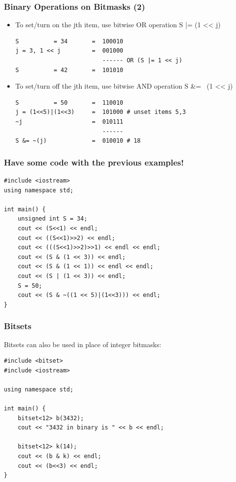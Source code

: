 \documentclass{beamer}
\begin{document}
\begin{frame}[fragile]
  \frametitle{Binary Operations on Bitmasks (2)}
  {\smaller
  \begin{itemize}
  \item To set/turn on the jth item, use bitwise OR operation S |= (1 << j)
\begin{verbatim}
S          = 34       =  100010
j = 3, 1 << j         =  001000
                         ------ OR (S |= 1 << j)
S          = 42       =  101010
\end{verbatim}
\item To set/turn off the jth item, use bitwise AND operation S \&= ~(1 << j)
\begin{verbatim}
S          = 50       =  110010
j = (1<<5)|(1<<3)     =  101000 # unset items 5,3 
~j                    =  010111
                         ------
S &= ~(j)             =  010010 # 18
\end{verbatim}
  \end{itemize}

  }
\end{frame}

\begin{frame}[fragile]
  \frametitle{Have some code with the previous examples!}
  {\smaller
\begin{verbatim}
#include <iostream>
using namespace std;

int main() {
    unsigned int S = 34;    
    cout << (S<<1) << endl;
    cout << ((S<<1)>>2) << endl;
    cout << (((S<<1)>>2)>>1) << endl << endl;    
    cout << (S & (1 << 3)) << endl;
    cout << (S & (1 << 1)) << endl << endl;    
    cout << (S | (1 << 3)) << endl;    
    S = 50;
    cout << (S & ~((1 << 5)|(1<<3))) << endl;
}
\end{verbatim}

  }
\end{frame}


\begin{frame}[fragile]
  \frametitle{Bitsets}
  {\smaller

  Bitsets can also be used in place of integer bitmasks:

  \begin{block}{}
\begin{verbatim}
#include <bitset>
#include <iostream>

using namespace std;

int main() {
    bitset<12> b(3432);
    cout << "3432 in binary is " << b << endl;
    
    bitset<12> k(14);
    cout << (b & k) << endl;
    cout << (b<<3) << endl;
}
\end{verbatim}
  \end{block}
  }
\end{frame}
\end{document}
